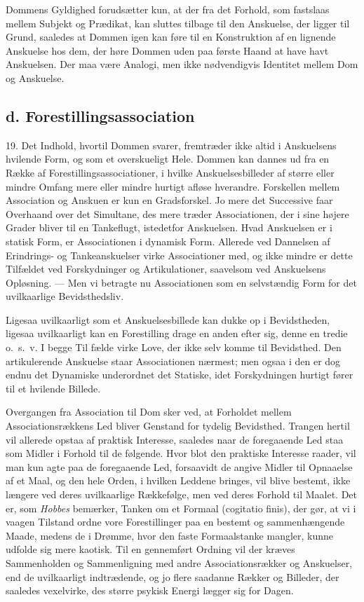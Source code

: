 \documentclass[12pt,a4paper]{book}
\newcommand{\opage}[1]{\marginnote{\footnotesize\textit{[#1]}}}
\begin{document}
Dommens Gyldighed forudsætter kun, at der fra det Forhold,
som fastslaas mellem Subjekt og Prædikat, kan sluttes tilbage til den
Anskuelse, der ligger til Grund, saaledes at Dommen igen kan føre til en
Konstruktion af en lignende Anskuelse hos dem, der høre Dommen uden paa
første Haand at have havt Anskuelsen. Der maa være Analogi, men ikke
nødvendigvis Identitet mellem Dom og Anskuelse.

\subsection*{d. Forestillingsassociation}
\label{ssec:association}

19. Det Indhold, hvortil Dommen svarer, fremtræder ikke altid i
Anskuelsens hvilende Form, og som et overskueligt Hele. Dommen kan dannes
ud fra en Række af Forestillingsassociationer, i hvilke
Anskuelsesbilleder af større eller mindre Omfang mere eller mindre
hurtigt afløse hverandre. Forskellen mellem Association og Anskuen er kun
en Gradsforskel. Jo mere det Successive faar Overhaand over det
Simultane, des mere træder Associationen, der i sine højere Grader bliver
til en Tankeflugt, istedetfor Anskuelsen. Hvad Anskuelsen er i statisk
Form, er Associationen i dynamisk Form. Allerede ved Dannelsen af
Erindrings- og Tankeanskuelser virke Associationer med, og ikke mindre er
dette Tilfældet ved Forskydninger og Artikulationer, saavelsom ved
Anskuelsens Opløsning. --- Men vi betragte nu Associationen som en
selvstændig Form for det uvilkaarlige Bevidsthedsliv.

Ligesaa uvilkaarligt som et Anskuelsesbillede kan dukke op i
Bevidstheden, ligesaa uvilkaarligt kan en Forestilling drage en anden
efter sig, denne en tredie o.\ s.\ v. I begge Til%
\opage{60}fælde virke Love, der
ikke selv komme til Bevidsthed. Den artikulerende Anskuelse staar
Associationen nærmest; men ogsaa i den er dog endnu det Dynamiske
underordnet det Statiske, idet Forskydningen hurtigt fører til et
hvilende Billede.

Overgangen fra Association til Dom sker ved, at Forholdet mellem
Associationsrækkens Led bliver Genstand for tydelig Bevidsthed. Trangen
hertil vil allerede opstaa af praktisk Interesse, saaledes naar de
foregaaende Led staa som Midler i Forhold til de følgende. Hvor blot den
praktiske Interesse raader, vil man kun agte paa de foregaaende Led,
forsaavidt de angive Midler til Opnaaelse af et Maal, og den hele Orden,
i hvilken Leddene bringes, vil blive bestemt, ikke længere ved deres
uvilkaarlige Rækkefølge, men ved deres Forhold til Maalet. Det er, som
\emph{Hobbes} bemærker, Tanken om et Formaal (cogitatio finis), der gør,
at vi i vaagen Tilstand ordne vore Forestillinger paa en bestemt og
sammenhængende Maade, medens de i Drømme, hvor den faste Formaalstanke
mangler, kunne udfolde sig mere kaotisk. Til en gennemført Ordning vil
der kræves Sammenholden og Sammenligning med andre Associationsrækker og
Anskuelser, end de uvilkaarligt indtrædende, og jo flere saadanne Rækker
og Billeder, der saaledes vexelvirke, des større psykisk Energi lægger
sig for Dagen.
\end{document}
